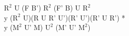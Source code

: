 $\text{R}^2$ U (F B') $\text{R}^2$ (F' B) U $\text{R}^2$\\
y ($\text{R}^2$ U)(R U R' U')(R' U')(R' U R') *\\
y ($\text{M}^2$ U' M) $\text{U}^2$ (M' U' $\text{M}^2$)\\
